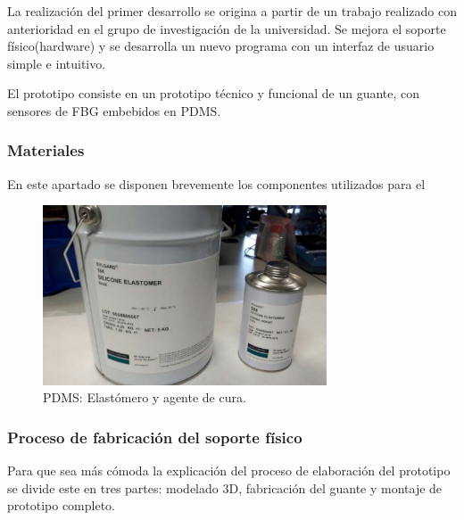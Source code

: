 La realización del primer desarrollo se origina a partir de un trabajo realizado con anterioridad en el grupo de investigación de la universidad\cite{SilviaTFM}. Se mejora el soporte físico(hardware) y se desarrolla un nuevo programa con un interfaz de usuario simple e intuitivo.

El prototipo consiste en un prototipo técnico y funcional de un guante, con sensores de FBG embebidos en PDMS. 
 
\subsubsection{Materiales}
En este apartado se disponen brevemente los componentes utilizados para el 
\begin{figure}[H]
	\centering
	\includegraphics[width=0.75\textwidth]{./img/PDMS}
	\caption{PDMS: Elastómero y agente de cura.} \label{fig:pdms}
\end{figure}



\subsubsection{Proceso de fabricación del soporte físico}
Para que sea más cómoda la explicación del proceso de elaboración del prototipo se divide este en tres partes: modelado 3D, fabricación del guante y montaje de prototipo completo.

